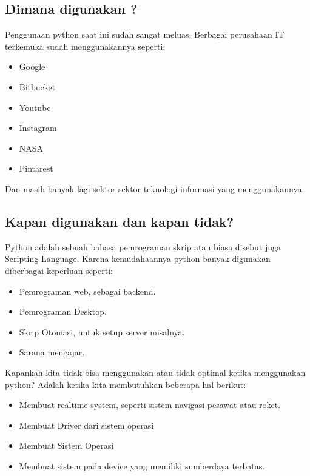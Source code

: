 \subsection{Dimana digunakan ?}
Penggunaan python saat ini sudah sangat meluas. Berbagai perusahaan IT terkemuka sudah menggunakannya seperti:
\begin{itemize}
    \item  Google
    \item  Bitbucket
    \item  Youtube
    \item  Instagram
    \item  NASA
    \item  Pintarest
\end{itemize}
Dan masih banyak lagi sektor-sektor teknologi informasi yang menggunakannya. 
\subsection{Kapan digunakan dan kapan tidak?}
Python adalah sebuah bahasa pemrograman skrip atau biasa disebut juga Scripting Language. Karena kemudahaannya python banyak digunakan diberbagai keperluan seperti:
\begin{itemize}
    \item Pemrograman web, sebagai backend.
    \item Pemrograman Desktop.
    \item Skrip Otomasi, untuk setup server misalnya.
    \item Sarana mengajar.
\end{itemize}

Kapankah kita tidak bisa menggunakan atau tidak optimal ketika menggunakan python? Adalah ketika kita membutuhkan beberapa hal berikut:
\begin{itemize}
  \item Membuat realtime system, seperti sistem navigasi pesawat atau roket.
  \item Membuat Driver dari sistem operasi
  \item Membuat Sistem Operasi
  \item Membuat sistem pada device yang memiliki sumberdaya terbatas.
\end{itemize}

\newpage 

